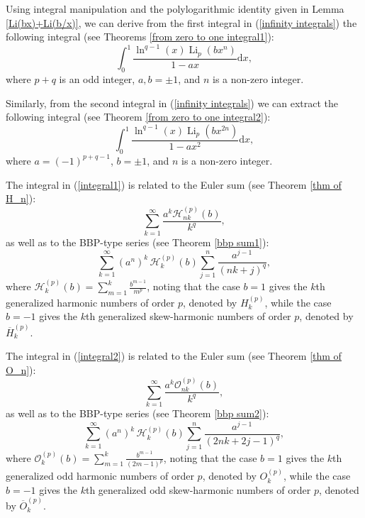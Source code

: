 \documentclass[11pt,reqno]{article}
\begin{document}
Using integral manipulation and the polylogarithmic identity given in Lemma \ref{Li(bx)+Li(b/x)}, we can derive from the first integral in (\ref{infinity integrals}) the following integral (see Theorems \ref{from zero to one integral1}):
\begin{equation}
	\int_0^1\frac{\ln^{q-1}(x)\operatorname{Li}_p(bx^{n})}{1-ax}\mathrm{d} x,\label{integral1}
\end{equation}
where $p+q$ is an odd integer, $a, b = \pm 1$, and $n$ is a non-zero integer. 

Similarly, from the second integral in (\ref{infinity integrals}) we can extract the following integral (see Theorem \ref{from zero to one integral2}):	 
\begin{equation}
	\int_0^1\frac{\ln^{q-1}(x)\operatorname{Li}_p(bx^{2n})}{1-ax^2}\mathrm{d} x,\label{integral2}
\end{equation}	 	 
where $a={(-1)}^{p+q-1}$, $b = \pm 1$, and $n$ is a non-zero integer.

The integral in (\ref{integral1}) is related to the Euler sum (see Theorem \ref{thm of H_n}):
\begin{equation}
	\sum_{k=1}^\infty\frac{a^k \mathcal{H}_{nk}^{(p)}(b)}{k^q},\label{Euler sums1}
\end{equation}
as well as to the BBP-type series (see Theorem \ref{bbp sum1}):
\begin{equation}
	\sum_{k=1}^\infty {(a^n)}^{k}\, \mathcal{H}_k^{(p)}(b)\sum_{j=1}^{n}\frac{a^{j-1}}{{(nk+j)}^q},\label{BBP type1}
\end{equation}
where $\mathcal{H}_{k}^{(p)}(b)=\sum_{m=1}^{k}\frac{b^{m-1}}{m^p}$, noting that the case $b=1$ gives the $k$th generalized harmonic numbers of order $p$, denoted by $H_{k}^{(p)}$, while the case $b=-1$ gives the $k$th generalized skew-harmonic numbers of order $p$, denoted by $\overline{H}_{k}^{(p)}$. 

The integral in (\ref{integral2}) is related to the Euler sum (see Theorem \ref{thm of O_n}):
\begin{equation}
	\sum_{k=1}^\infty\frac{a^k \mathcal{O}_{nk}^{(p)}(b)}{k^q},\label{Euler sums2}
\end{equation}
as well as to the BBP-type series (see Theorem \ref{bbp sum2}):	
\begin{equation}
	\sum_{k=1}^\infty {(a^n)}^{k}\, \mathcal{H}_k^{(p)}(b)\sum_{j=1}^{n}\frac{a^{j-1}}{{(2nk+2j-1)}^q},\label{BBP type2}
\end{equation}
where $\mathcal{O}_{k}^{(p)}(b)=\sum_{m=1}^{k}\frac{b^{m-1}}{(2m-1)^p}$, noting that the case $b=1$ gives the $k$th generalized odd harmonic numbers of order $p$, denoted by $O_{k}^{(p)}$, while the case $b=-1$ gives the $k$th generalized odd skew-harmonic numbers of order $p$, denoted by $\overline{O}_{k}^{(p)}$. 
\end{document}
